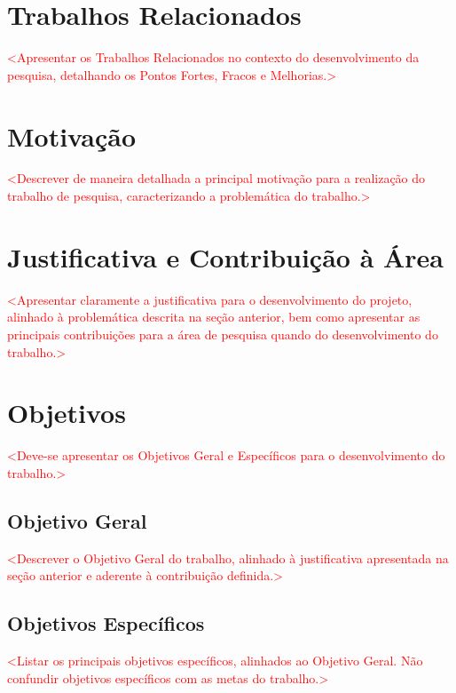 \documentclass[
	12pt,				%
	openright,			%
	oneside,			%
	a4paper,			%
	chapter=TITLE,		%
	english,			%
	french,				%
	spanish,			%
	brazil				%
	]{abntex2}
\begin{document}
\chapter{Trabalhos Relacionados}
\label{cap:trabalhosrelacionados}

\textcolor{red}{<Apresentar os Trabalhos Relacionados no contexto do desenvolvimento da pesquisa, detalhando os Pontos Fortes, Fracos e Melhorias.>}

\chapter{Motivação}
\label{cap:motivacao}

\textcolor{red}{<Descrever de maneira detalhada a principal motivação para a realização do trabalho de pesquisa, caracterizando a problemática do trabalho.>}

\chapter{Justificativa e Contribuição à Área}
\label{cap:justificativa}

\textcolor{red}{<Apresentar claramente a justificativa para o desenvolvimento do projeto, alinhado à problemática descrita na seção anterior, bem como apresentar as principais contribuições para a área de pesquisa quando do desenvolvimento do trabalho.>}

\chapter{Objetivos}
\label{cap:objetivos}

\textcolor{red}{<Deve-se apresentar os Objetivos Geral e Específicos para o desenvolvimento do trabalho.>}

\section{Objetivo Geral}

\textcolor{red}{<Descrever o Objetivo Geral do trabalho, alinhado à justificativa apresentada na seção anterior e aderente à contribuição definida.>}

\section{Objetivos Específicos}

\textcolor{red}{<Listar os principais objetivos específicos, alinhados ao Objetivo Geral. Não confundir objetivos específicos com as metas do trabalho.>}
\end{document}
